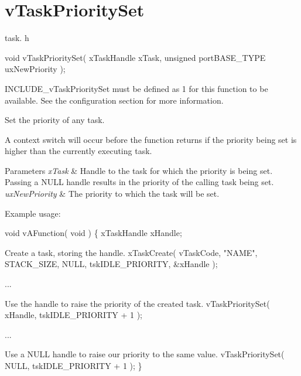 \hypertarget{group__v_task_priority_set}{\section{v\-Task\-Priority\-Set}
\label{group__v_task_priority_set}
}
task. h 
\begin{DoxyPre}void vTaskPrioritySet( xTaskHandle xTask, unsigned portBASE\_TYPE uxNewPriority );\end{DoxyPre}


I\-N\-C\-L\-U\-D\-E\-\_\-v\-Task\-Priority\-Set must be defined as 1 for this function to be available. See the configuration section for more information.

Set the priority of any task.

A context switch will occur before the function returns if the priority being set is higher than the currently executing task.


\begin{DoxyParams}{Parameters}
{\em x\-Task} & Handle to the task for which the priority is being set. Passing a N\-U\-L\-L handle results in the priority of the calling task being set.\\
\hline
{\em ux\-New\-Priority} & The priority to which the task will be set.\\
\hline
\end{DoxyParams}
Example usage\-: 
\begin{DoxyPre}
 void vAFunction( void )
 \{
 xTaskHandle xHandle;\end{DoxyPre}



\begin{DoxyPre}Create a task, storing the handle.
         xTaskCreate( vTaskCode, "NAME", STACK\_SIZE, NULL, tskIDLE\_PRIORITY, \&xHandle );\end{DoxyPre}



\begin{DoxyPre}...\end{DoxyPre}



\begin{DoxyPre}Use the handle to raise the priority of the created task.
         vTaskPrioritySet( xHandle, tskIDLE\_PRIORITY + 1 );\end{DoxyPre}



\begin{DoxyPre}...\end{DoxyPre}



\begin{DoxyPre}Use a NULL handle to raise our priority to the same value.
         vTaskPrioritySet( NULL, tskIDLE\_PRIORITY + 1 );
 \}
   \end{DoxyPre}
 